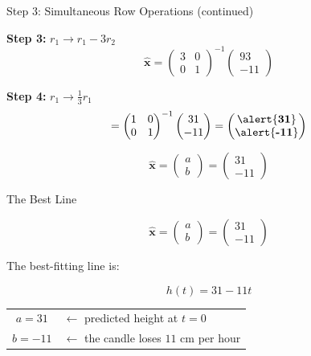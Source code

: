 \documentclass[10pt]{beamer}
\theoremstyle{definition}
\newcommand{\x}[1]{\alert{\textbf{#1}}}
\begin{document}
\begin{frame}{Step 3: Simultaneous Row Operations (continued)}

\textbf{Step 3:} $r_1 \to r_1 - 3r_2$
$$\hat{\mathbf{x}} = \begin{pmatrix} 3 & 0 \\ 0 & 1 \end{pmatrix}^{-1}\begin{pmatrix} 93 \\ -11 \end{pmatrix}$$

\textbf{Step 4:} $r_1 \to \frac{1}{3}r_1$
$$= \begin{pmatrix} 1 & 0 \\ 0 & 1 \end{pmatrix}^{-1}\begin{pmatrix} 31 \\ -11 \end{pmatrix} = \begin{pmatrix} \x{31} \\ \x{-11} \end{pmatrix}$$

\vspace{0.5em}

$$\hat{\mathbf{x}} = \begin{pmatrix} a \\ b \end{pmatrix} = \begin{pmatrix} 31 \\ -11 \end{pmatrix}$$

\end{frame}


\begin{frame}{The Best Line}

$$\hat{\mathbf{x}} = \begin{pmatrix} a \\ b \end{pmatrix} = \begin{pmatrix} 31 \\ -11 \end{pmatrix}$$

\vspace{0.5em}

The best-fitting line is:

$$\boxed{h(t) = 31 - 11t}$$

\vspace{0.5em}

\begin{center}
\renewcommand{\arraystretch}{1.3}
\begin{tabular}{cl}
$a = 31$ & $\leftarrow$ predicted height at $t = 0$ \\
$b = -11$ & $\leftarrow$ the candle loses $11$ cm per hour
\end{tabular}
\end{center}

\end{frame}
\end{document}
